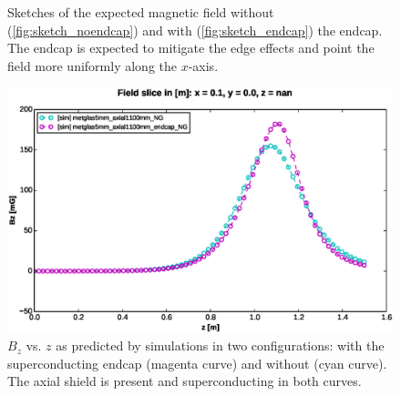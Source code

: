 \documentclass[twocolumn,aps,prb,citeautoscript]{revtex4-1}
\begin{document}
\begin{figure}
    \;\;\;\;\;\;\;\;\;\;\;\;\;\;\;\;\;\;\;\;\;\;\;\;
    \caption{\label{fig:sketches} Sketches of the expected magnetic field without (\ref{fig:sketch_noendcap})
    and with (\ref{fig:sketch_endcap}) the endcap. The endcap is expected to mitigate the edge effects and
    point the field more uniformly along the $x$-axis.}
\end{figure}

\begin{figure}
    \includegraphics[width=\textwidth]{figures/Bz_z_sim.eps}
    \caption{\label{fig:Bz_z_sim}$B_z$ vs. $z$ as predicted by simulations in two configurations: with the
    superconducting endcap (magenta curve) and without (cyan curve). The axial shield
    is present and superconducting in both curves.}
\end{figure}
\end{document}
